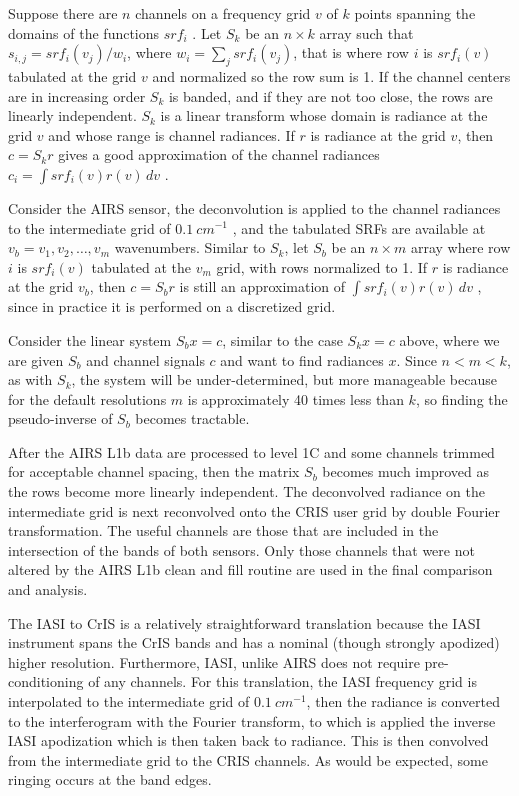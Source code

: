 \documentclass[11pt]{article}
\begin{document}
Suppose there are \(n\) channels on a frequency grid \(v\) of \(k\) points spanning the domains of the functions \(srf_i\) . Let \(S_k\) be an \(n\times k\) array such that \(s_{i,j} = srf_i(v_j)/w_i\), where \(w_i = \sum_j srf_i(v_j)\), that is where row \(i\) is \(srf_i(v)\) tabulated at the grid \(v\) and normalized so the row sum is 1.  If the channel centers are in increasing order \(S_k\) is banded, and if they are not too close,  the rows are linearly independent.  \(S_k\) is a linear transform whose domain is radiance at the grid \(v\) and whose range is channel radiances.  If \(r\) is radiance at the grid \(v\), then \(c = S_k r\) gives a good approximation of the channel radiances \(c_i = \int srf_i(v)r(v)\,dv\) .

Consider the AIRS sensor, the deconvolution is applied to the channel radiances to the intermediate grid of \(0.1\ cm^{-1}\) , and the tabulated SRFs are available at \(v_b = v_1,v_2,\ldots,v_m\) wavenumbers.  Similar to \(S_k\), let \(S_b\) be an \(n\times m\) array where row \(i\) is \(srf_i(v)\) tabulated at the \(v_m\) grid, with rows normalized to 1. If \(r\) is radiance at the grid \(v_b\), then \(c = S_b r\) is still an approximation of \(\int srf_i(v)r(v)\,dv\) , since in practice it is performed on a discretized grid.

Consider the linear system \(S_b x = c\), similar to the case \(S_k x = c\) above, where we are given \(S_b\) and channel signals \(c\) and want to find radiances \(x\).  Since \(n < m < k\), as with \(S_k\), the system will be under-determined, but more manageable because for the default resolutions \(m\) is approximately 40 times less than \(k\), so finding the pseudo-inverse of \(S_b\) becomes tractable.

After the AIRS L1b data are processed to level 1C and some channels trimmed for acceptable channel spacing, then the matrix \(S_b\) becomes much improved as the rows become more linearly independent. The deconvolved radiance on the intermediate grid is next reconvolved onto the CRIS user grid by double Fourier transformation. The useful channels are those that are included in the intersection of the bands of both sensors.  Only those channels that were not altered by the AIRS L1b clean and fill routine are used in the final comparison and analysis.

The IASI to CrIS is a relatively straightforward translation because the IASI instrument spans the CrIS bands and has a nominal (though strongly apodized) higher resolution. Furthermore, IASI, unlike AIRS does not require pre-conditioning of any channels. For this translation, the IASI frequency grid is interpolated to the intermediate grid of \(0.1\ cm^{-1}\), then the radiance is converted to the interferogram with the Fourier transform, to which is applied the inverse IASI apodization which is then taken back to radiance. This is then convolved from the intermediate grid to the CRIS channels. As would be expected, some ringing occurs at the band edges.
\end{document}
